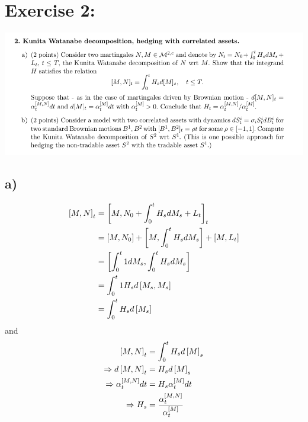 \documentclass[document.tex]{subfiles}
\begin{document}
\section*{Exercise 2:}


\includegraphics[width=\textwidth]{ex2.png}
\subsection*{a)}
\begin{align*}
	\left[M , N \right]_t &= \left[M , N_0 + \int_0^t H_s dM_s + L_t \right]_t\\
	&= \left[M , N_0 \right] + \left[M , \int_0^t H_s dM_s \right] + \left[M , L_t \right]\\
	&= \left[\int_0^t 1 dM_s , \int_0^t H_s dM_s \right]\\
	&= \int_0^t 1 H_s d \left[M_s , M_s \right]\\
	&= \int_0^t H_s d \left[ M_s \right]
\end{align*}
and \\
\begin{align*}
	\left[M , N \right]_t &= \int_0^t H_s d \left[ M \right]_s \\
	\Rightarrow	d \left[M , N \right]_t &= H_s d \left[ M \right]_s \\
	\Rightarrow	\alpha_t^{\left[M , N \right]} dt &= H_s \alpha_t^{\left[ M \right]} dt \\
	\Rightarrow H_s &= \frac{\alpha_t^{\left[M , N \right]}}{\alpha_t^{\left[ M \right]}}
\end{align*}
\end{document}
